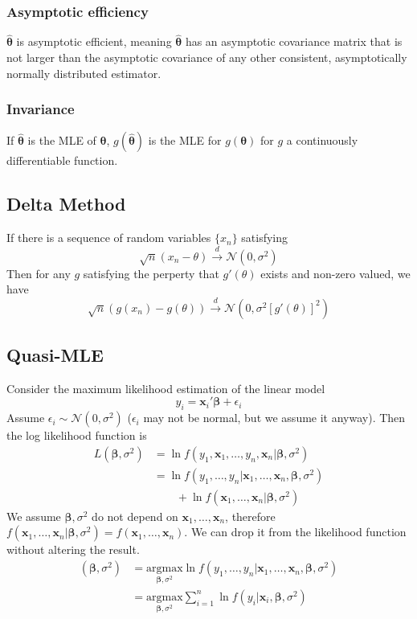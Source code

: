 \documentclass[%
 aip,
 jmp,%
 amsmath,amssymb,
 reprint,%
]{revtex4-1}
\def\N{{\mathbb N}}
\def\b{\beta}
\def\e{\epsilon}
\def\s{\sigma}
\def\th{\theta}
\def\N{\mathcal{N}} %
\def\dto{\overset{d}{\to}}
\def\h{\hat}
\newcommand{\sumn}[1]{\sum_{i=1}^{n} #1}
\renewcommand{\vec}[1]{\bm{#1}}
\begin{document}
\subsubsection{Asymptotic efficiency}
$\vec{\h\th}$ is asymptotic efficient, meaning $\vec{\h\th}$ has an asymptotic covariance matrix
that is not larger than the asymptotic covariance of any other consistent, asymptotically normally
distributed estimator.

\subsubsection{Invariance}
If $\vec{\h\th}$ is the MLE of $\vec{\th}$, $g(\vec{\h\th})$ is the MLE for $g(\vec{\th})$
for $g$ a continuously differentiable function.

\subsection{Delta Method}
If there is a sequence of random variables $\{x_n\}$ satisfying
$$ \sqrt{n}(x_n - \th) \dto \N(0, \s^2) $$
Then for any $g$ satisfying the perperty that $g'(\th)$ exists and non-zero valued, we have
$$ \sqrt{n}(g(x_n) - g(\th)) \dto \N(0, \s^2 [g'(\th)]^2) $$

\subsection{Quasi-MLE}
Consider the maximum likelihood estimation of the linear model
$$ y_i = \vec x_i' \vec\b + \e_i $$
Assume $\e_i \sim \N(0,\s^2)$ ($\e_i$ may not be normal, but we assume it anyway).
Then the log likelihood function is
\begin{align*}
  L(\vec\b, \s^2) &= \ln f(y_1, \vec x_1, \dots, y_n, \vec x_n | \vec\b, \s^2) \\
    &= \ln f(y_1, \dots, y_n| \vec x_1, \dots, \vec x_n, \vec\b, \s^2) \\
    &\qquad + \ln f(\vec x_1, \dots, \vec x_n|\vec\b, \s^2)
\end{align*}
We assume $\vec\b, \s^2$ do not depend on $\vec x_1, \dots, \vec x_n$,
therefore $f(\vec x_1, \dots, \vec x_n|\vec\b, \s^2) = f(\vec x_1, \dots, \vec x_n)$.
We can drop it from the likelihood function without altering the result.
\begin{align*}
  (\vec\b, \s^2) &= \underset{\vec\b, \s^2}{\mathrm{argmax}} \ln f(y_1, \dots, y_n| \vec x_1, \dots, \vec x_n, \vec\b, \s^2) \\
                 &= \underset{\vec\b, \s^2}{\mathrm{argmax}} \sumn \ln f(y_i|\vec x_i, \vec\b, \s^2)
\end{align*}
\end{document}
